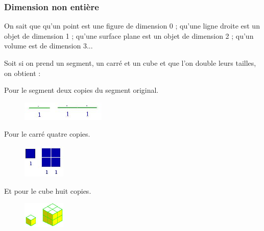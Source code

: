 \documentclass[a4paper]{article}
\begin{document}
\subsubsection{Dimension non entière}

On sait que qu'un point est une figure de dimension 0 ; qu'une ligne droite est un objet de dimension 1 ; qu'une surface plane est un objet de dimension 2 ; qu'un volume est de dimension 3...

Soit si on prend un segment, un carré et un cube et que l'on double leurs tailles, on obtient :

\begin{center}
Pour le segment deux copies du segment original.
\begin{figure}[H]
\begin{center}
\includegraphics[width=4cm]{diseg.jpg}
\end{center}
\end{figure}
Pour le carré quatre copies.
\begin{figure}[H]
\begin{center}
\includegraphics[width=2cm]{disq.jpg}
\end{center}
\end{figure}
Et pour le cube huit copies.
\begin{figure}[H]
\begin{center}
\includegraphics[width=2cm]{dicu.jpg}
\end{center}
\end{figure}
\end{center}
\end{document}
